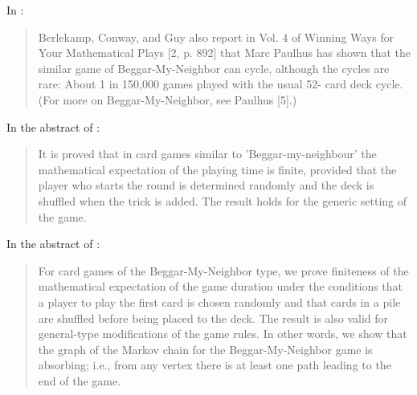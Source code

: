 \documentclass[a4paper,12pt]{article}
\begin{document}
In \cite{spivey2010cycles}:
\begin{quotation}
Berlekamp, Conway, and Guy also report in Vol. 4 of Winning Ways for Your Mathematical
Plays [2, p. 892] that Marc Paulhus has shown that the similar game of Beggar-My-Neighbor
can cycle, although the cycles are rare: About 1 in 150,000 games played with the usual 52-
card deck cycle. (For more on Beggar-My-Neighbor, see Paulhus [5].)
\end{quotation}

In the abstract of \cite{russians_arxiv}:
\begin{quotation}
It is proved that in card games similar to 'Beggar-my-neighbour' the mathematical expectation of the playing time is finite, provided that the player who starts the round is determined randomly and the deck is shuffled when the trick is added. The result holds for the generic setting of the game.
\end{quotation}

In the abstract of \cite{russians_2013}:
\begin{quotation}
For card games of the Beggar-My-Neighbor type, we prove finiteness of the mathematical expectation of the game duration under the conditions that a player to play the first card is chosen randomly and that cards in a pile are shuffled before being placed to the deck. The result is also valid for general-type modifications of the game rules. In other words, we show that the graph of the Markov chain for the Beggar-My-Neighbor game is absorbing; i.e., from any vertex there is at least one path leading to the end of the game.
\end{quotation}



\end{document}
